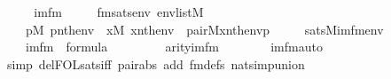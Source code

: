 \begin{isabellebody}
%
\isadelimproof
%
\endisadelimproof
%
\isatagproof
{}\isamarkupfalse%
\ {\isacharminus}{\kern0pt}\isanewline
\ \ \isamarkupfalse%
\ imfm\ \isanewline
\ \ \ \ fmsats{\isacharcolon}{\kern0pt}{\isachardoublequoteopen}{\isasymAnd}env{\isachardot}{\kern0pt}\ env{\isasymin}list{\isacharparenleft}{\kern0pt}M{\isacharparenright}{\kern0pt}\ {\isasymLongrightarrow}\isanewline
\ \ \ \ {\isacharparenleft}{\kern0pt}{\isasymexists}p{\isasymin}M{\isachardot}{\kern0pt}\ p{\isasymin}nth{\isacharparenleft}{\kern0pt}{}{\isacharcomma}{\kern0pt}env{\isacharparenright}{\kern0pt}\ {\isacharampersand}{\kern0pt}\ {\isacharparenleft}{\kern0pt}{\isasymexists}x{\isasymin}M{\isachardot}{\kern0pt}\ x{\isasymin}nth{\isacharparenleft}{\kern0pt}{}{\isacharcomma}{\kern0pt}env{\isacharparenright}{\kern0pt}\ {\isacharampersand}{\kern0pt}\ pair{\isacharparenleft}{\kern0pt}{\isacharhash}{\kern0pt}{\isacharhash}{\kern0pt}M{\isacharcomma}{\kern0pt}x{\isacharcomma}{\kern0pt}nth{\isacharparenleft}{\kern0pt}{}{\isacharcomma}{\kern0pt}env{\isacharparenright}{\kern0pt}{\isacharcomma}{\kern0pt}p{\isacharparenright}{\kern0pt}{\isacharparenright}{\kern0pt}{\isacharparenright}{\kern0pt}\isanewline
\ \ \ \ {\isasymlongleftrightarrow}\ sats{\isacharparenleft}{\kern0pt}M{\isacharcomma}{\kern0pt}imfm{\isacharparenleft}{\kern0pt}{}{\isacharcomma}{\kern0pt}{}{\isacharcomma}{\kern0pt}{}{\isacharparenright}{\kern0pt}{\isacharcomma}{\kern0pt}env{\isacharparenright}{\kern0pt}{\isachardoublequoteclose}\isanewline
\ \ \ \ \isanewline
\ \ \ \ {\isachardoublequoteopen}imfm{\isacharparenleft}{\kern0pt}{}{\isacharcomma}{\kern0pt}{}{\isacharcomma}{\kern0pt}{}{\isacharparenright}{\kern0pt}\ {\isasymin}\ formula{\isachardoublequoteclose}\isanewline
\ \ \ \ \isanewline
\ \ \ \ {\isachardoublequoteopen}arity{\isacharparenleft}{\kern0pt}imfm{\isacharparenleft}{\kern0pt}{}{\isacharcomma}{\kern0pt}{}{\isacharcomma}{\kern0pt}{}{\isacharparenright}{\kern0pt}{\isacharparenright}{\kern0pt}\ {\isacharequal}{\kern0pt}\ {}{\isachardoublequoteclose}\isanewline
\ \ \ \ \isamarkupfalse%
\ im{\isacharunderscore}{\kern0pt}fm{\isacharunderscore}{\kern0pt}auto\ \isamarkupfalse%
\ {\isacharparenleft}{\kern0pt}simp\ del{\isacharcolon}{\kern0pt}FOL{\isacharunderscore}{\kern0pt}sats{\isacharunderscore}{\kern0pt}iff\ pair{\isacharunderscore}{\kern0pt}abs\ add{\isacharcolon}{\kern0pt}\ fm{\isacharunderscore}{\kern0pt}defs\ nat{\isacharunderscore}{\kern0pt}simp{\isacharunderscore}{\kern0pt}union{\isacharparenright}{\kern0pt}\isanewline

\end{isabellebody}
